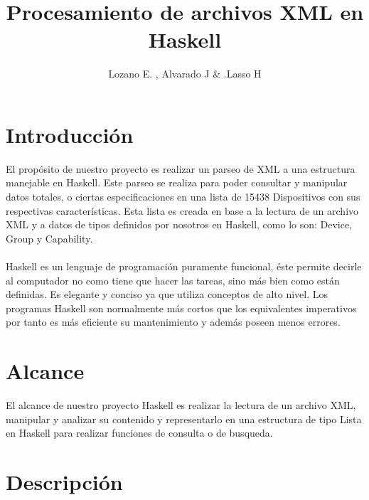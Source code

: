 \documentclass[11pt]{article} %
\title{Procesamiento de archivos  XML  en Haskell}
\author{Lozano E. , Alvarado J \& .Lasso H}
\begin{document}
\maketitle

\section{Introducción}
El propósito de nuestro proyecto es realizar un parseo de XML a una estructura manejable en Haskell. Este parseo se realiza para poder consultar y manipular datos totales, o ciertas especificaciones en una lista de 15438 Dispositivos con sus respectivas características. Esta lista es creada en base a la lectura de un archivo XML y a datos de tipos definidos por nosotros en Haskell, como lo son: Device, Group y Capability. \\
\\ Haskell es un lenguaje de programación puramente funcional, éste permite decirle al computador no como tiene que hacer las tareas, sino más bien como están definidas. Es elegante y conciso ya que utiliza conceptos de alto nivel. Los programas Haskell son normalmente más cortos que los equivalentes imperativos por tanto es más eficiente su mantenimiento y además poseen menos errores.

\section{Alcance}
El alcance de nuestro proyecto Haskell es realizar la lectura de un archivo XML, manipular y analizar su contenido y representarlo en una estructura de tipo Lista en Haskell para realizar funciones de consulta o de busqueda.

\section{Descripción}
\end{document}
